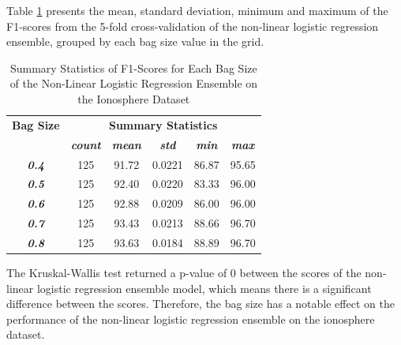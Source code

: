\documentclass[10pt, conference]{IEEEtran}
\begin{document}
Table \ref{table: I_bagsize_nonlinear_performance_metrics} presents the mean, standard deviation, minimum and maximum of the
F1-scores from the 5-fold cross-validation of the non-linear logistic regression ensemble, grouped by each bag size
value in the grid.
\begin{table}[H]
    \caption{Summary Statistics of F1-Scores for Each Bag Size of the Non-Linear Logistic Regression Ensemble on the Ionosphere Dataset}
    \begin{center}
        \begin{tabular}{|c||c|c|c|c|c|}
            \hline
            \textbf{Bag Size}&\multicolumn{5}{|c|}{\textbf{Summary Statistics}} \\
            \cline{2-6}
                                &\textbf{\textit{count}} & \textbf{\textit{mean}} & \textbf{\textit{std}} & \textbf{\textit{min}} & \textbf{\textit{max}}\\
            \hline
            \textbf{\textit{0.4}} & 125 & 91.72 & 0.0221 & 86.87 & 95.65 \\
            \textbf{\textit{0.5}} & 125 & 92.40 & 0.0220 & 83.33 & 96.00 \\
            \textbf{\textit{0.6}} & 125 & 92.88 & 0.0209 & 86.00 & 96.00 \\
            \textbf{\textit{0.7}} & 125 & 93.43 & 0.0213 & 88.66 & 96.70 \\
            \textbf{\textit{0.8}} & 125 & 93.63 & 0.0184 & 88.89 & 96.70 \\
            \hline
        \end{tabular}
    \end{center}
    \label{table: I_bagsize_nonlinear_performance_metrics}
\end{table}
The Kruskal-Wallis test returned a p-value of 0 between the scores of the non-linear logistic regression ensemble model,
which means there is a significant difference between the scores. Therefore, the bag size has a notable effect on the
performance of the non-linear logistic regression ensemble on the ionosphere dataset.
\end{document}
